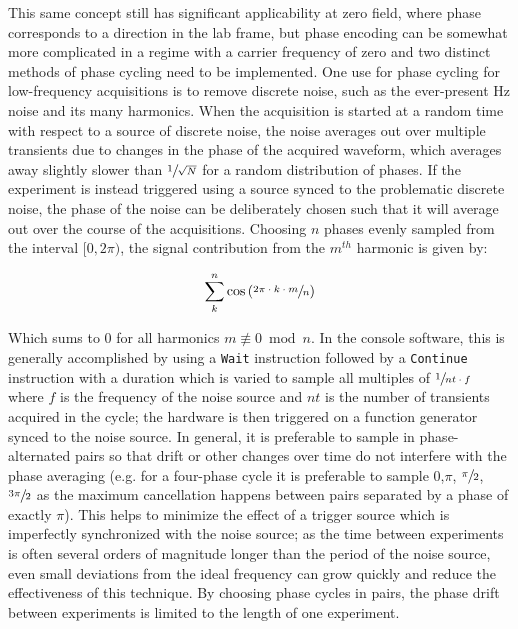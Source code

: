 \documentclass[PaulGanssle-Thesis.tex]{subfiles}
\begin{document}
This same concept still has significant applicability at zero field, where phase corresponds to a direction in the lab frame, but phase encoding can be somewhat more complicated in a regime with a carrier frequency of zero and two distinct methods of phase cycling need to be implemented. One use for phase cycling for low-frequency acquisitions is to remove discrete noise, such as the ever-present \unit[60]{Hz} noise and its many harmonics. When the acquisition is started at a random time with respect to a source of discrete noise, the noise averages out over multiple transients due to changes in the phase of the acquired waveform, which averages away slightly slower than $\sfrac{1}{\sqrt{N}}$ for a random distribution of phases. If the experiment is instead triggered using a source synced to the problematic discrete noise, the phase of the noise can be deliberately chosen such that it will average out over the course of the acquisitions. Choosing $n$ phases evenly sampled from the interval $[0, 2\pi)$, the signal contribution from the $m^{th}$ harmonic is given by:

\begin{equation}
\sum_{k}^{n}\cos{(\sfrac{2\pi\cdot{}k\cdot{}m}{n})}
\end{equation} 

Which sums to 0 for all harmonics $m \not\equiv 0 \bmod{n}$. In the console software, this is generally accomplished by using a \lstinline|Wait| instruction followed by a \lstinline|Continue| instruction with a duration which is varied to sample all multiples of $\sfrac{1}{nt\cdot{}f}$ where $f$ is the frequency of the noise source and $nt$ is the number of transients acquired in the cycle; the hardware is then triggered on a function generator synced to the noise source. In general, it is preferable to sample in phase-alternated pairs so that drift or other changes over time do not interfere with the phase averaging (e.g. for a four-phase cycle it is preferable to sample 0,$\pi$, $\sfrac{\pi}{2}$, $\sfrac{3\pi}{2}$ as the maximum cancellation happens between pairs separated by a phase of exactly $\pi$). This helps to minimize the effect of a trigger source which is imperfectly synchronized with the noise source; as the time between experiments is often several orders of magnitude longer than the period of the noise source, even small deviations from the ideal frequency can grow quickly and reduce the effectiveness of this technique. By choosing phase cycles in pairs, the phase drift between experiments is limited to the length of one experiment.
\end{document}
